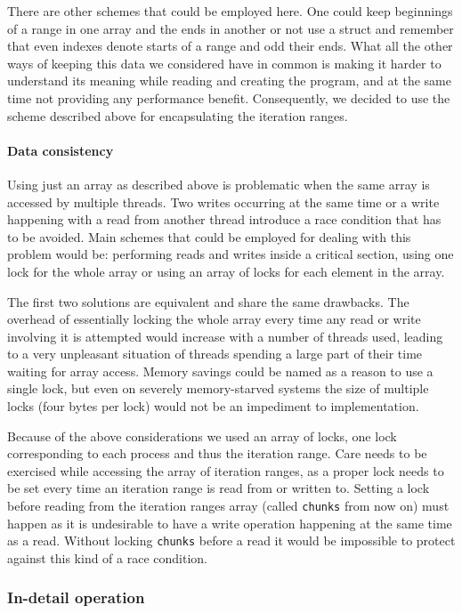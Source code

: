 \documentclass[11pt,a4paper]{article}
\begin{document}
There are other schemes that could be employed here. 
One could keep beginnings of a range in one array and the ends in another or not use a struct and remember that even indexes denote starts of a range and odd their ends. 
What all the other ways of keeping this data we considered have in common is making it harder to understand its meaning while reading and creating the program, and at the same time not providing any performance benefit.
Consequently, we decided to use the scheme described above for encapsulating the iteration ranges.

\paragraph{Data consistency}
Using just an array as described above is problematic when the same array is accessed by multiple threads.
Two writes occurring at the same time or a write happening with a read from another thread introduce a race condition that has to be avoided.
Main schemes that could be employed for dealing with this problem would be: performing reads and writes inside a critical section, using one lock for the whole array or using an array of locks for each element in the array.

The first two solutions are equivalent and share the same drawbacks. 
The overhead of essentially locking the whole array every time any read or write involving it is attempted would increase with a number of threads used, leading to a very unpleasant situation of threads spending a large part of their time waiting for array access.
Memory savings could be named as a reason to use a single lock, but even on severely memory-starved systems the size of multiple locks (four bytes per lock) would not be an impediment to implementation.

Because of the above considerations we used an array of locks, one lock corresponding to each process and thus the iteration range.
Care needs to be exercised while accessing the array of iteration ranges, as a proper lock needs to be set every time an iteration range is read from or written to.
Setting a lock before reading from the iteration ranges array (called \texttt{chunks} from now on) must happen as it is undesirable to have a write operation happening at the same time as a read.
Without locking \texttt{chunks} before a read it would be impossible to protect against this kind of a race condition.

\subsubsection{In-detail operation}
\end{document}
